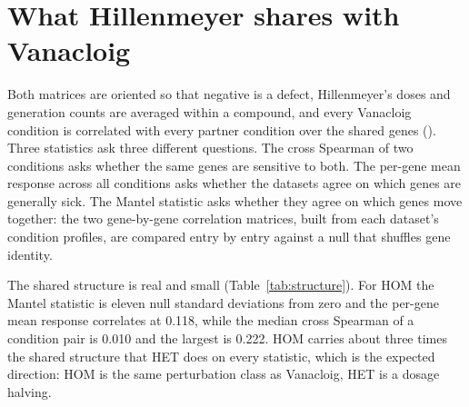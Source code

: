 
\section{What Hillenmeyer shares with Vanacloig}
\label{sec:structure}

Both matrices are oriented so that negative is a defect, Hillenmeyer's doses and
generation counts are averaged within a compound, and every Vanacloig condition is
correlated with every partner condition over the shared genes
().
Three statistics ask three different questions. The cross Spearman of two conditions
asks whether the same genes are sensitive to both. The per-gene mean response across
all conditions asks whether the datasets agree on which genes are generally sick. The
Mantel statistic asks whether they agree on which genes move together: the two
gene-by-gene correlation matrices, built from each dataset's condition profiles, are
compared entry by entry against a null that shuffles gene identity.

\begin{table}[htbp]
\centering
\footnotesize
\caption{Shared response structure between Vanacloig and each Hillenmeyer arm. The
cross Spearman columns summarize the full condition-by-condition matrix; the Mantel
column is the Spearman between the two gene-gene profile-correlation matrices on
1{,}500 sampled genes, with the mean and SD of 20 gene-permutation nulls.}
\label{tab:structure}

\end{table}

The shared structure is real and small (Table~\ref{tab:structure}). For HOM the Mantel
statistic is eleven null standard deviations from zero and the per-gene mean response
correlates at 0.118, while the median cross Spearman of a condition pair is 0.010 and
the largest is 0.222. HOM carries about three times the shared structure that HET does
on every statistic, which is the expected direction: HOM is the same perturbation class
as Vanacloig, HET is a dosage halving.


